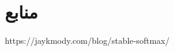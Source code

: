 \documentclass{article}
\begin{document}







\section*{منابع}
\renewcommand{\section}[2]{}%
\begin{thebibliography}{99} %


\begin{LTRitems}

\resetlatinfont

 https://jaykmody.com/blog/stable-softmax/

\end{LTRitems}

\end{thebibliography}
\end{document}
